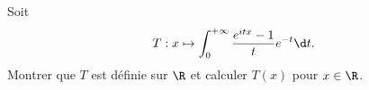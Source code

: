 \begin{enonce}
\begin{exercise}[ID={RMS130 E733},subtitle={Mines-Ponts PSI 2019},tags={}, difficulty={0}]
Soit
\begin{equation*}
  T: x\mapsto \int_0^{+\infty} \frac{e^{itx} - 1}{t} e^{-t} \d t.
\end{equation*}
  Montrer que $T$ est définie sur $\R$ et calculer $T(x)$ pour $x\in\R$.
\end{exercise}
\begin{solution}
\end{solution}
\end{enonce}
